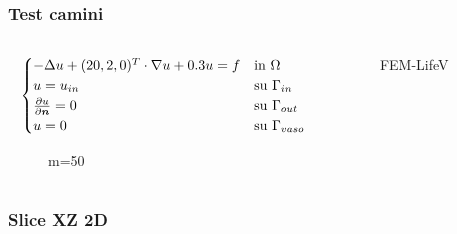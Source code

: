 \begin{frame}
\frametitle{Test camini}
\begin{columns}
\quad
\begin{column}{0.5 \paperwidth}
\begin{block}{}
\vspace{-0.5cm}
\begin{center}
{\footnotesize
\begin{equation}
\begin{cases}
-\Delta u + (20,2,0)^T\cdot \nabla u + 0.3 u = f & \text{in $\Omega$}\\
u=u_{in} & \text{su $\Gamma_{in}$}\\
\frac{\partial u}{\partial \boldsymbol{n}}=0 & \text{su $\Gamma_{out}$ }\\
u=0 & \text{su $\Gamma _{vaso}$} \\
\end{cases}
\end{equation}
}
\end{center}
\end{block}
\begin{figure}m=50
{}
\end{figure}
\end{column}
\begin{column}{0.5 \paperwidth}
\begin{figure}
\subfigure
{}

FEM-LifeV
\subfigure
{}
\end{figure}
\end{column}
\end{columns}
\end{frame}

\begin{frame}
\frametitle{Slice XZ 2D}

\begin{columns}

\begin{column}{0.5 \paperwidth}
\begin{figure}
\end{figure}
\end{column}

\begin{column}{0.5 \paperwidth}
\begin{figure}
\end{figure}
\end{column}
\end{columns}


\end{frame}

